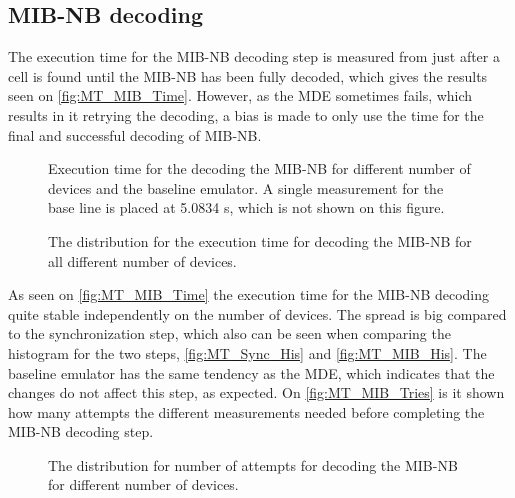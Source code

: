 \subsection{MIB-NB decoding}
The execution time for the MIB-NB decoding step is measured from just after a cell is found until the MIB-NB has been fully decoded, which gives the results seen on \autoref{fig:MT_MIB_Time}. However, as the MDE sometimes fails, which results in it retrying the decoding, a bias is made to only use the time for the final and successful decoding of MIB-NB.


\captionsetup{belowskip=0em}
\begin{minipage}{0.48\textwidth}
\begin{figure}[H]
\centering
\resizebox{\textwidth}{!}{
}
\caption{Execution time for the decoding the MIB-NB for different number of devices and the baseline emulator. A single measurement for the base line is placed at 5.0834 s, which is not shown on this figure.}
\label{fig:MT_MIB_Time}
\end{figure}
\end{minipage}%
\hfill
\begin{minipage}{0.48\textwidth}
\begin{figure}[H]
\centering
\resizebox{\textwidth}{!}{
}
\caption{The distribution for the execution time for decoding the MIB-NB for all different number of devices.}
\label{fig:MT_MIB_His}
\end{figure}
\end{minipage}
\captionsetup{belowskip=-1.5em}

As seen on \autoref{fig:MT_MIB_Time} the execution time for the MIB-NB decoding quite stable independently on the number of devices. The spread is big compared to the synchronization step, which also can be seen when comparing the histogram for the two steps, \autoref{fig:MT_Sync_His} and \autoref{fig:MT_MIB_His}. The baseline emulator has the same tendency as the MDE, which indicates that the changes do not affect this step, as expected. On \autoref{fig:MT_MIB_Tries} is it shown how many attempts the different measurements needed before completing the MIB-NB decoding step.

\begin{figure}[H]
\centering

\caption{The distribution for number of attempts for decoding the MIB-NB for different number of devices.}
\label{fig:MT_MIB_Tries}
\end{figure}

